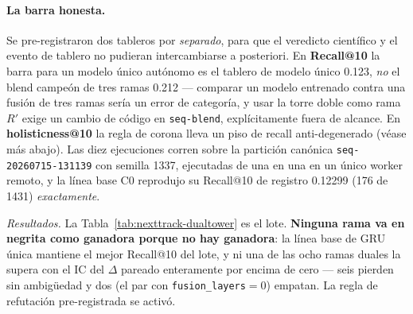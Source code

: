 \documentclass[11pt]{article}
\newcommand{\dsid}[1]{\texttt{\small #1}}
\newcommand{\Rp}{\ensuremath{R'}}
\begin{document}
\paragraph{La barra honesta.} Se pre-registraron dos tableros por
\emph{separado}, para que el veredicto científico y el evento de tablero no
pudieran intercambiarse a posteriori. En \textbf{Recall@10} la barra para un
modelo único autónomo es el tablero de modelo único \num{0.123}, \emph{no} el
blend campeón de tres ramas \num{0.212} --- comparar un modelo entrenado contra
una fusión de tres ramas sería un error de categoría, y usar la torre doble como
rama \Rp{} exige un cambio de código en \texttt{seq-blend}, explícitamente fuera
de alcance. En \textbf{holisticness@10} la regla de corona lleva un piso de
recall anti-degenerado (véase más abajo). Las diez ejecuciones corren sobre la
partición canónica \dsid{seq-20260715-131139} con semilla 1337, ejecutadas de una
en una en un único worker remoto, y la línea base C0 reprodujo su Recall@10 de
registro \num{0.12299} (\num{176} de \num{1431}) \emph{exactamente}.

\emph{Resultados.} La Tabla~\ref{tab:nexttrack-dualtower} es el lote. \textbf{Ninguna rama
va en negrita como ganadora porque no hay ganadora}: la línea base de GRU única
mantiene el mejor Recall@10 del lote, y ni una de las ocho ramas duales la supera
con el IC del $\Delta$ pareado enteramente por encima de cero --- seis pierden
sin ambigüedad y dos (el par con \texttt{fusion\_layers}${}=0$) empatan. La regla
de refutación pre-registrada se activó.
\end{document}
